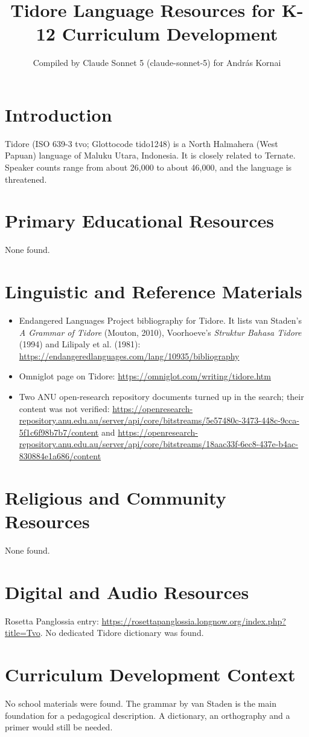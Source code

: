 \documentclass[12pt]{article}
\title{Tidore Language Resources for K-12 Curriculum Development}
\author{Compiled by Claude Sonnet 5 (claude-sonnet-5) for Andr\'as Kornai}
\date{}
\begin{document}
\maketitle

\section{Introduction}
Tidore (ISO 639-3 tvo; Glottocode tido1248) is a North Halmahera (West Papuan) language of Maluku Utara, Indonesia. It is closely related to Ternate. Speaker counts range from about 26,000 to about 46,000, and the language is threatened.

\section{Primary Educational Resources}
None found.

\section{Linguistic and Reference Materials}
\begin{itemize}
\item Endangered Languages Project bibliography for Tidore. It lists van Staden's \emph{A Grammar of Tidore} (Mouton, 2010), Voorhoeve's \emph{Struktur Bahasa Tidore} (1994) and Lilipaly et al. (1981): \url{https://endangeredlanguages.com/lang/10935/bibliography}
\item Omniglot page on Tidore: \url{https://omniglot.com/writing/tidore.htm}
\item Two ANU open-research repository documents turned up in the search; their content was not verified: \url{https://openresearch-repository.anu.edu.au/server/api/core/bitstreams/5e57480c-3473-448c-9cca-5f1c6f98b7b7/content} and \url{https://openresearch-repository.anu.edu.au/server/api/core/bitstreams/18aac33f-6ec8-437e-b4ac-830884e1a686/content}
\end{itemize}

\section{Religious and Community Resources}
None found.

\section{Digital and Audio Resources}
Rosetta Panglossia entry: \url{https://rosettapanglossia.longnow.org/index.php?title=Tvo}. No dedicated Tidore dictionary was found.

\section{Curriculum Development Context}
No school materials were found. The grammar by van Staden is the main foundation for a pedagogical description. A dictionary, an orthography and a primer would still be needed.
\end{document}
